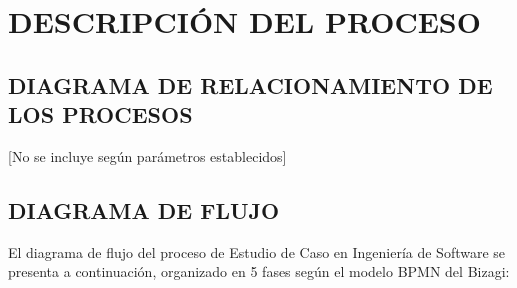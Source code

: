 \documentclass[12pt,a4paper]{article}
\begin{document}
\section{DESCRIPCIÓN DEL PROCESO}

\subsection{DIAGRAMA DE RELACIONAMIENTO DE LOS PROCESOS}

[No se incluye según parámetros establecidos]

\subsection{DIAGRAMA DE FLUJO}

El diagrama de flujo del proceso de Estudio de Caso en Ingeniería de Software se presenta a continuación, organizado en 5 fases según el modelo BPMN del Bizagi:
\end{document}
